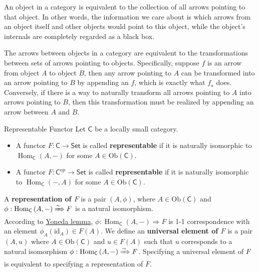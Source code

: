 An object in a category is equivalent to the collection of all arrows pointing to that object. In other words, the information we care about is which arrows from an object itself and other objects would point to this object, while the object's internals are completely regarded as a black box. 

The arrows between objects in a category are equivalent to the transformations between sets of arrows pointing to objects. Specifically, suppose $f$ is an arrow from object $A$ to object $B$, then any arrow pointing to $A$ can be transformed into an arrow pointing to $B$ by appending an $f$, which is exactly what $f_\star$ does. Conversely, if there is a way to naturally transform all arrows pointing to $A$ into arrows pointing to $B$, then this transformation must be realized by appending an arrow between $A$ and $B$.

\begin{definition}{Representable Functor}{}
    Let $\mathsf{C}$ be a locally small category. 
    \begin{itemize}
        \item A functor $F:\mathsf{C}\to \mathsf{Set}$ is called \textbf{representable} if it is naturally isomorphic to $\operatorname{Hom}_{\mathsf{C}}\left(A,-\right)$ for some $A\in \mathrm{Ob}(\mathsf{C})$.
        \item A functor $F:\mathsf{C}^{\mathrm{op}}\to \mathsf{Set}$ is called \textbf{representable} if it is naturally isomorphic to $\operatorname{Hom}_{\mathsf{C}}\left(-,A\right)$ for some $A\in \mathrm{Ob}(\mathsf{C})$.
    \end{itemize}
    A \textbf{representation of $F$} is a pair $(A,\phi)$, where $A\in \mathrm{Ob}(\mathsf{C})$ and $\phi:  \operatorname{Hom}_{\mathsf{C}}\left(A,-\right)\xRightarrow{\sim} F$ is a natural isomorphism. \\
    According to \hyperref[th:yoneda_lemma]{Yoneda lemma}, $\phi:\operatorname{Hom}_{\mathsf{C}}\left(A,-\right)\Rightarrow  F$ is 1-1 correspondence with an element $\phi_A(\mathrm{id}_A)\in F(A)$. We define an \textbf{universal element of $F$} is a pair $(A,u)$ where $A\in \mathrm{Ob}(\mathsf{C})$ and $u\in F(A)$ such that $u$ corresponds to a natural isomorphism $\phi: \operatorname{Hom}_{\mathsf{C}}\left(A,-\right)\xRightarrow{\sim} F$. Specifying a universal element of $F$ is equivalent to specifying a representation of $F$.
\end{definition}

